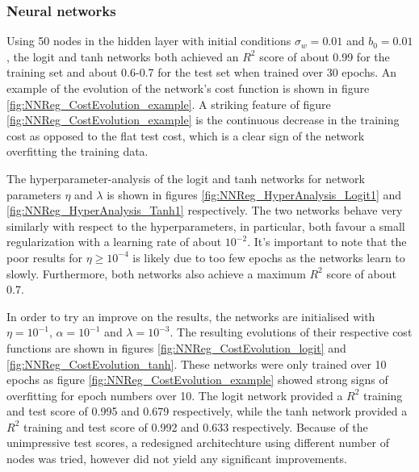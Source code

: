 \documentclass[nofootinbib,reprint,english]{revtex4-1}
\begin{document}
\subsubsection{Neural networks}
Using 50 nodes in the hidden layer with initial conditions \(\sigma_w=0.01\) and \(b_0=0.01\), the logit and tanh networks both achieved an \(R^2\) score of about 0.99 for the training set and about 0.6-0.7 for the test set when trained over 30 epochs. An example of the evolution of the network's cost function is shown in figure \ref{fig:NNReg_CostEvolution_example}. A striking feature of figure \ref{fig:NNReg_CostEvolution_example} is the continuous decrease in the training cost as opposed to the flat test cost, which is a clear sign of the network overfitting the training data.

The hyperparameter-analysis of the logit and tanh networks for network parameters \(\eta\) and \(\lambda\) is shown in figures \ref{fig:NNReg_HyperAnalysis_Logit1} and \ref{fig:NNReg_HyperAnalysis_Tanh1} respectively. The two networks behave very similarly with respect to the hyperparameters, in particular, both favour a small regularization with a learning rate of about \(10^{-2}\). It's important to note that the poor results for \(\eta\geq10^{-4}\) is likely due to too few epochs as the networks learn to slowly. Furthermore, both networks also achieve a maximum \(R^2\) score of about 0.7.

In order to try an improve on the results, the networks are initialised with \(\eta=10^{-1}\), \(\alpha=10^{-1}\) and \(\lambda=10^{-3}\). The resulting evolutions of their respective cost functions are shown in figures \ref{fig:NNReg_CostEvolution_logit} and \ref{fig:NNReg_CostEvolution_tanh}. These networks were only trained over 10 epochs as figure \ref{fig:NNReg_CostEvolution_example} showed strong signs of overfitting for epoch numbers over 10. The logit network provided a \(R^2\) training and test score of 0.995 and 0.679 respectively, while the tanh network provided a \(R^2\) training and test score of 0.992 and 0.633 respectively. Because of the unimpressive test scores, a redesigned architechture using different number of nodes was tried, however did not yield any significant improvements.
\end{document}
